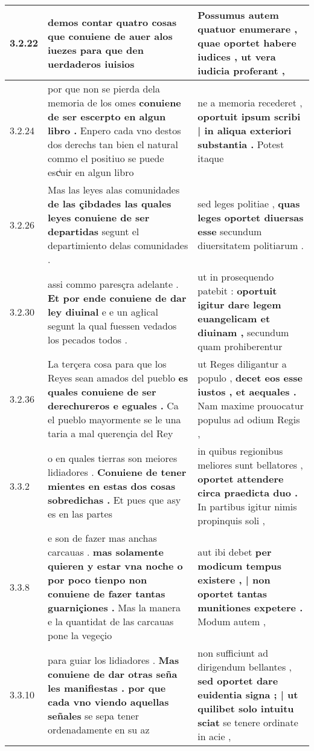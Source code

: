 \begin{tabular}{|p{1cm}|p{6.5cm}|p{6.5cm}|}
3.2.22 & demos contar quatro cosas \textbf{ que conuiene de auer alos iuezes } para que den uerdaderos iuisios & Possumus autem quatuor enumerare , \textbf{ quae oportet habere iudices , } ut vera iudicia proferant , \\\hline
3.2.24 & por que non se pierda dela memoria de los omes \textbf{ conuiene de ser escerpto en algun libro . } Enpero cada vno destos dos derechs tan bien el natural commo el positiuo se puede escͥuir en algun libro & ne a memoria recederet , \textbf{ oportuit ipsum scribi | in aliqua exteriori substantia . } Potest itaque \\\hline
3.2.26 & Mas las leyes alas comunidades \textbf{ de las çibdades las quales leyes conuiene de ser departidas } segunt el departimiento delas comunidades . & sed leges politiae , \textbf{ quas leges oportet diuersas esse } secundum diuersitatem politiarum . \\\hline
3.2.30 & assi commo paresçra adelante . \textbf{ Et por ende conuiene de dar ley diuinal } e e un agłical segunt la qual fuessen vedados los pecados todos . & ut in prosequendo patebit : \textbf{ oportuit igitur dare legem euangelicam et diuinam , } secundum quam prohiberentur \\\hline
3.2.36 & La terçera cosa para que los Reyes sean amados del pueblo \textbf{ es quales conuiene de ser derechureros e eguales . } Ca el pueblo mayormente se le una taria a mal querençia del Rey & ut Reges diligantur a populo , \textbf{ decet eos esse iustos , et aequales . } Nam maxime prouocatur populus ad odium Regis , \\\hline
3.3.2 & o en quales tierras son meiores lidiadores . \textbf{ Conuiene de tener mientes en estas dos cosas sobredichas . } Et pues que asy es en las partes & in quibus regionibus meliores sunt bellatores , \textbf{ oportet attendere circa praedicta duo . } In partibus igitur nimis propinquis soli , \\\hline
3.3.8 & e son de fazer mas anchas carcauas . \textbf{ mas solamente quieren y estar vna noche o por poco tienpo non conuiene de fazer tantas guarniçiones . } Mas la manera e la quantidat de las carcauas pone la vegeçio & aut ibi debet \textbf{ per modicum tempus existere , | non oportet tantas munitiones expetere . } Modum autem , \\\hline
3.3.10 & para guiar los lidiadores . \textbf{ Mas conuiene de dar otras seña les manifiestas . por que cada vno viendo aquellas señales } se sepa tener ordenadamente en su az & non sufficiunt ad dirigendum bellantes , \textbf{ sed oportet dare euidentia signa ; | ut quilibet solo intuitu sciat } se tenere ordinate in acie , \\\hline

\end{tabular}
